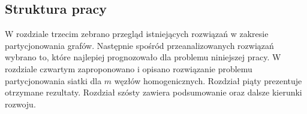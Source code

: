\subsection{Struktura pracy}

W rozdziale trzecim zebrano przegląd istniejących rozwiązań w zakresie partycjonowania grafów.
Następnie spośród przeanalizowanych rozwiązań wybrano to, które najlepiej prognozowało dla
problemu niniejszej pracy.
W rozdziale czwartym zaproponowano i opisano rozwiązanie problemu partycjonowania siatki dla
$m$ węzłów homogenicznych.
Rozdział piąty prezentuje otrzymane rezultaty.
Rozdział szósty zawiera podsumowanie oraz dalsze kierunki rozwoju.